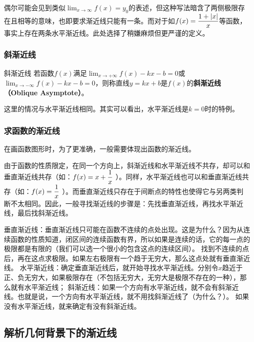 偶尔可能会见到类似$\displaystyle \lim_{x\to \infty}f(x)=y_0$的表述，但这种写法暗含了两侧极限存在且相等的意味，也即要求渐近线只能有一条。而对于如$\displaystyle f(x)={1+|x|\over x}$等函数，事实上存在两条水平渐近线。此处选择了稍嫌麻烦但更严谨的定义。

\subsubsection{斜渐近线}

\begin{definition}{斜渐近线}
若函数$f(x)$满足$\displaystyle \lim_{x\to +\infty}f(x)-kx-b=0$或$\displaystyle \lim_{x\to -\infty}f(x)-kx-b=0$，则称直线$y=kx+b$是$f(x)$的\textbf{斜渐近线（Oblique Asymptote）}。
\end{definition}

这里的情况与水平渐近线相同。其实可以看出，水平渐近线是$k=0$时的特例。


\subsubsection{求函数的渐近线}

在画函数图形时，为了更准确，一般需要体现出函数的渐近线。

由于函数的性质限定，在同一个方向上，斜渐近线和水平渐近线不共存，却可以和垂直渐近线共存（如：$\displaystyle f(x)=x+{1\over x}$ ）。同样，水平渐近线也可以和垂直渐近线共存（如：$\displaystyle f(x)={1\over x}$ ）。而垂直渐近线只存在于间断点的特性也使得它与另两类判断不太相同。因此，一般寻找渐近线的步骤是：先找垂直渐近线，再找水平渐近线，最后找斜渐近线。

垂直渐近线：垂直渐近线只可能在函数不连续的点处出现。这是为什么？因为从连续函数的性质知道，闭区间的连续函数有界，所以如果是连续的话，它的每一点的极限都是有限的（我们可以选一个很小的包含这点的连续区间）。
找到不连续的点后，再在这点求极限。如果左右极限有一个趋于无穷大，那么这点处就有垂直渐近线。
水平渐近线：确定垂直渐近线后，就开始寻找水平渐近线。分别令$x$趋近于正、负无穷大，如果极限存在（不包括无穷大，无穷大是极限不存在的一种），那么就有水平渐近线；
斜渐近线：如果一个方向有水平渐近线，就不会有斜渐近线。也就是说，一个方向有水平渐近线，就不用找斜渐近线了（为什么？）。 如果没有水平渐近线，就来确定有没有斜渐近线。



\subsection{解析几何背景下的渐近线}


